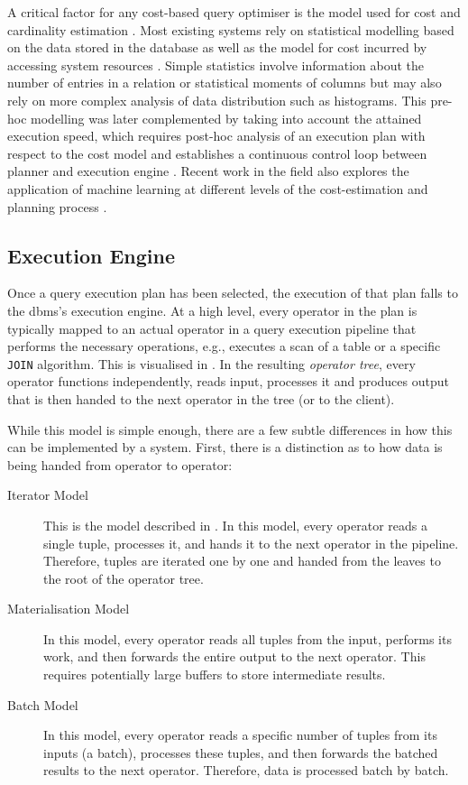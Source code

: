 A critical factor for any cost-based query optimiser is the model used for cost and cardinality estimation \cite{Jarke:1984Query,Yin:2015Robust}. Most existing systems rely on statistical modelling based on the data stored in the database \cite{Getoor:2001Selectivity,Ioannidis:2003History} as well as the model for cost incurred by accessing system resources \cite{Manegold:2002Generic}. Simple statistics involve information about the number of entries in a relation or statistical moments of columns but may also rely on more complex analysis of data distribution such as histograms. This pre-hoc modelling was later complemented by taking into account the attained execution speed, which requires post-hoc analysis of an execution plan with respect to the cost model and establishes a continuous control loop between planner and execution engine \cite{Mackert:1986R}. Recent work in the field also explores the application of machine learning at different levels of the cost-estimation and planning process \cite{Wu:2013Predicting,Vu:2019Deep,Abadi:2020Seattle}.

\subsection{Execution Engine}

Once a query execution plan has been selected, the execution of that plan falls to the \acrshort{dbms}'s execution engine. At a high level, every operator in the plan is typically mapped to an actual operator in a query execution pipeline that performs the necessary operations, e.g., executes a scan of a table or a specific \texttt{JOIN} algorithm. This is visualised in . In the resulting \emph{operator tree}, every operator functions independently, reads input, processes it and produces output that is then handed to the next operator in the tree (or to the client).

While this model is simple enough, there are a few subtle differences in how this can be implemented by a system. First, there is a distinction as to how data is being handed from operator to operator:

\begin{description}
    \item[Iterator Model] This is the model described in \cite{Graefe:1993Volcano,Graefe:1993Query}. In this model, every operator reads a single tuple, processes it, and hands it to the next operator in the pipeline. Therefore, tuples are iterated one by one and handed from the leaves to the root of the operator tree.
    \item[Materialisation Model] In this model, every operator reads all tuples from the input, performs its work, and then forwards the entire output to the next operator. This requires potentially large buffers to store intermediate results.
    \item[Batch Model] In this model, every operator reads a specific number of tuples from its inputs (a batch), processes these tuples, and then forwards the batched results to the next operator. Therefore, data is processed batch by batch.
\end{description}

